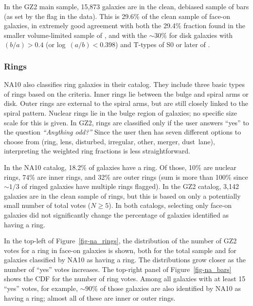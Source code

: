 \documentclass[useAMS,usenatbib]{mn2e}
\begin{document}
In the GZ2 main sample, 15,873 galaxies are in the clean, debiased sample of bars (as set by the flag in the data). This is 29.6\% of the clean sample of face-on galaxies, in extremely good agreement with both the 29.4\% fraction found in the smaller volume-limited sample of \citet{mas11c}, and with the $\sim30\%$ for disk galaxies with $(b/a)>0.4$ (or log~$(a/b)<0.398$) and T-types of S0 or later of \citet{nai10a}. 


\subsubsection{Rings}

NA10 also classifies ring galaxies in their catalog. They include three basic types of rings based on the \citet{but96} criteria. Inner rings lie between the bulge and spiral arms or disk. Outer rings are external to the spiral arms, but are still closely linked to the spiral pattern. Nuclear rings lie in the bulge region of galaxies; no specific size scale for this is given. In GZ2, rings are classified only if the user answers ``yes'' to the question {\it ``Anything odd?''} Since the user then has seven different options to choose from (ring, lens, disturbed, irregular, other, merger, dust~lane), interpreting the weighted ring fractions is less straightforward. 

In the NA10 catalog, 18.2\% of galaxies have a ring. Of those, 10\% are nuclear rings, 74\% are inner rings, and 32\% are outer rings (sum is more than 100\% since $\sim1/3$ of ringed galaxies have multiple rings flagged). In the GZ2 catalog, 3,142 galaxies are in the clean sample of rings, but this is based on only a potentially small number of total votes ($N\geq5$). In both catalogs, selecting only face-on galaxies did not significantly change the percentage of galaxies identified as having a ring. 

In the top-left of Figure~\ref{fig-na_rings}, the distribution of the number of GZ2 votes for a ring in face-on galaxies is shown, both for the total sample and for galaxies classified by NA10 as having a ring. The distributions grow closer as the number of ``yes'' votes increases. The top-right panel of Figure~\ref{fig-na_bars} shows the CDF for the number of ring votes. Among all galaxies with at least 15 ``yes'' votes, for example, $\sim90\%$ of those galaxies are also identified by NA10 as having a ring; almost all of these are inner or outer rings.  
\end{document}
